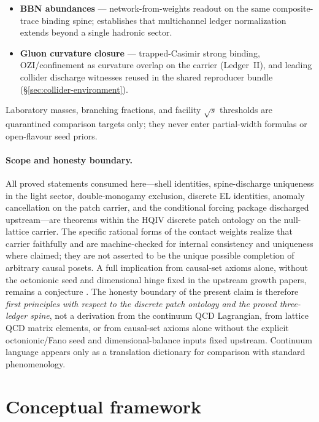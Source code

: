 \documentclass[11pt]{amsart}
\begin{document}
\begin{itemize}[leftmargin=2em]
  three-ledger $\beta$ decay, $G_F$ slot, weak bridge energy, and light-isotope
  tipping validated without half-life fit parameters (Ledger~III prototype).
\item \textbf{BBN abundances} \cite{hqiv-bbn-paper} ---
  network-from-weights readout on the same composite-trace binding spine;
  establishes that multichannel ledger normalization extends beyond a single
  hadronic sector.
\item \textbf{Gluon curvature closure} \cite{hqiv-gluon-curvature-note} ---
  trapped-Casimir strong binding, OZI/confinement as curvature overlap on the
  carrier (Ledger~II), and leading collider discharge witnesses reused in the
  shared reproducer bundle (\S\ref{sec:collider-environment}).
\end{itemize}

Laboratory masses, branching fractions, and facility $\sqrt{s}$ thresholds
\cite{pdg2024,belle2002,cms2018} are quarantined comparison targets only; they
never enter partial-width formulas or open-flavour seed priors.

\paragraph{Scope and honesty boundary.}
All proved statements consumed here---shell identities, spine-discharge
uniqueness in the light sector, double-monogamy exclusion, discrete EL
identities, anomaly cancellation on the patch carrier, and the conditional
forcing package discharged upstream---are theorems within the HQIV discrete patch
ontology on the null-lattice carrier.
The specific rational forms of the contact weights realize that carrier faithfully
and are machine-checked for internal consistency and uniqueness where claimed;
they are not asserted to be the unique possible completion of arbitrary causal
posets.
A full implication from causal-set axioms alone, without the octonionic seed and
dimensional hinge fixed in the upstream growth papers, remains a conjecture
\cite{hqiv-3d-growth-paper}.
The honesty boundary of the present claim is therefore \emph{first principles with
respect to the discrete patch ontology and the proved three-ledger spine}, not a
derivation from the continuum QCD Lagrangian, from lattice QCD matrix elements, or
from causal-set axioms alone without the explicit octonionic/Fano seed and
dimensional-balance inputs fixed upstream.
Continuum language appears only as a translation dictionary for comparison with
standard phenomenology.

\section{Conceptual framework}
\label{sec:framework}
\end{document}
